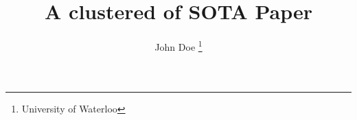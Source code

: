 \documentclass[lettersize,journal]{IEEEtran}
\begin{document}
\title{A clustered of \gls{SOTA} Paper}
\author{John Doe \thanks{University of Waterloo}}
 



\maketitle

\tableofcontents
%

\clearpage



%

\clearpage
\printglossaries    



\end{document}
